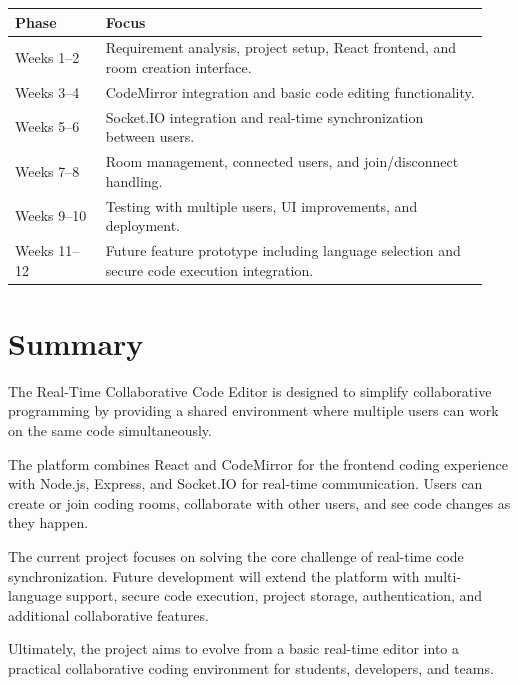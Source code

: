 \documentclass[11pt,letterpaper]{article}
\begin{document}
\begin{center}
\small

\begin{tabular}{@{}L{0.18\linewidth} L{0.76\linewidth}@{}}

\toprule

\textbf{Phase} & \textbf{Focus} \\

\midrule

Weeks 1--2 &
Requirement analysis, project setup, React frontend, and room creation interface. \\

Weeks 3--4 &
CodeMirror integration and basic code editing functionality. \\

Weeks 5--6 &
Socket.IO integration and real-time synchronization between users. \\

Weeks 7--8 &
Room management, connected users, and join/disconnect handling. \\

Weeks 9--10 &
Testing with multiple users, UI improvements, and deployment. \\

Weeks 11--12 &
Future feature prototype including language selection and secure code execution integration. \\

\bottomrule

\end{tabular}

\end{center}



\section{Summary}

The Real-Time Collaborative Code Editor is designed to simplify collaborative programming by providing a shared environment where multiple users can work on the same code simultaneously.

The platform combines React and CodeMirror for the frontend coding experience with Node.js, Express, and Socket.IO for real-time communication. Users can create or join coding rooms, collaborate with other users, and see code changes as they happen.

The current project focuses on solving the core challenge of real-time code synchronization. Future development will extend the platform with multi-language support, secure code execution, project storage, authentication, and additional collaborative features.

Ultimately, the project aims to evolve from a basic real-time editor into a practical collaborative coding environment for students, developers, and teams.
\end{document}

